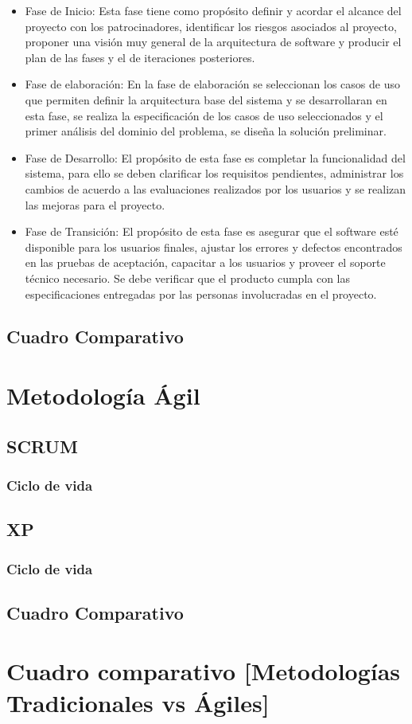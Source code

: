 \begin{itemize}

    \item Fase de Inicio: Esta fase tiene como propósito definir y acordar el alcance del proyecto con los patrocinadores, identificar los riesgos asociados al proyecto, proponer una visión muy general de la arquitectura de software y producir el plan de las fases y el de iteraciones posteriores.

	\item Fase de elaboración: En la fase de elaboración se seleccionan los casos de uso que permiten definir la arquitectura base del sistema y se desarrollaran en esta fase, se realiza la especificación de los casos de uso seleccionados y el primer análisis del dominio del problema, se diseña la solución preliminar.

	\item Fase de Desarrollo: El propósito de esta fase es completar la funcionalidad del sistema, para ello se deben clarificar los requisitos pendientes, administrar los cambios de acuerdo a las evaluaciones realizados por los usuarios y se realizan las mejoras para el proyecto.

	\item Fase de Transición: El propósito de esta fase es asegurar que el software esté disponible para los usuarios finales, ajustar los errores y defectos encontrados en las pruebas de aceptación, capacitar a los usuarios y proveer el soporte técnico necesario. Se debe verificar que el producto cumpla con las especificaciones entregadas por las personas involucradas en el proyecto.	

\end{itemize}
\subsection{Cuadro Comparativo}

\section{Metodología Ágil} 
\subsection{SCRUM}
\subsubsection{Ciclo de vida}
\subsection{XP}
\subsubsection{Ciclo de vida}
\subsection{}
\subsection{Cuadro Comparativo}

\section{Cuadro comparativo [Metodologías Tradicionales vs Ágiles]} 